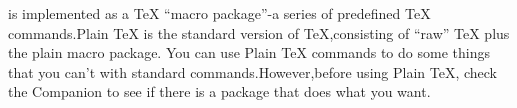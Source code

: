 \ltx{} is implemented as a \TeX{} ``macro package''-a series of predefined \TeX{}
commands.Plain \TeX{} is the standard version of \TeX{},consisting of ``raw'' \TeX{}
plus the plain macro package. You can use Plain \TeX{} commands to do some
things that you can't with standard \ltx{} commands.However,before using
Plain \TeX{}, check the \ltx{} Companion to see if there is a package that does
what you want.